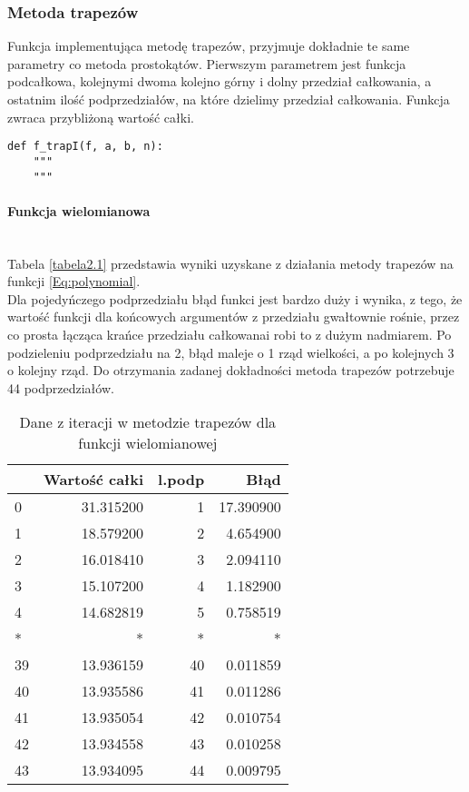 \documentclass[12pt,twoside]{article}
\begin{document}
\subsubsection{Metoda trapezów}

Funkcja implementująca metodę trapezów, przyjmuje dokładnie te same parametry co metoda prostokątów. Pierwszym parametrem jest funkcja podcałkowa, kolejnymi dwoma kolejno górny i dolny przedział całkowania, a ostatnim  ilość podprzedziałów, na które dzielimy przedział całkowania. Funkcja zwraca przybliżoną wartość całki.

\begin{lstlisting}[caption={Kod w języku python implementujący metodę trapezów}]
def f_trapI(f, a, b, n):
    """
    """
\end{lstlisting}
\label{Listing 7}

\paragraph{Funkcja wielomianowa}\mbox{} \\

Tabela \eqref{tabela2.1} przedstawia wyniki uzyskane z działania metody trapezów na funkcji \eqref{Eq:polynomial}.\\
Dla pojedyńczego podprzedziału błąd funkci jest bardzo duży i wynika, z tego, że wartość funkcji dla końcowych argumentów z przedziału gwałtownie rośnie, przez co prosta łącząca krańce przedziału całkowanai robi to z dużym nadmiarem. Po podzieleniu podprzedziału na 2, błąd maleje o 1 rząd wielkości, a po kolejnych 3 o kolejny rząd. Do otrzymania zadanej dokładności metoda trapezów potrzebuje 44 podprzedziałów.
\begin{table}[ht]
\centering 
\caption{Dane z iteracji w metodzie trapezów dla funkcji wielomianowej}
\label{tabela2.1}
\begin{tabular}{lrrr}
\toprule
{} &  Wartość całki &  l.podp &       Błąd \\
\midrule
0  &      31.315200 &       1 &  17.390900 \\
1  &      18.579200 &       2 &   4.654900 \\
2  &      16.018410 &       3 &   2.094110 \\
3  &      15.107200 &       4 &   1.182900 \\
4  &      14.682819 &       5 &   0.758519 \\
* &      * &      * &   * \\
39 &      13.936159 &      40 &   0.011859 \\
40 &      13.935586 &      41 &   0.011286 \\
41 &      13.935054 &      42 &   0.010754 \\
42 &      13.934558 &      43 &   0.010258 \\
43 &      13.934095 &      44 &   0.009795 \\
\bottomrule
\end{tabular}
\end{table}
\end{document}
